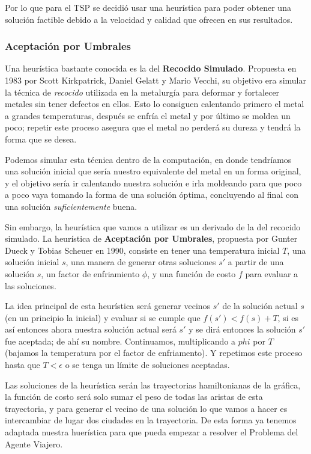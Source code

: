 \documentclass{article}
\newcommand{\tbf}[1]{\textbf{#1}}
\newcommand{\tit}[1]{\textit{#1}}
\begin{document}
  Por lo que para el TSP se decidió usar una heurística para poder 
  obtener una solución factible debido a la velocidad y calidad que
  ofrecen en sus resultados.

  \subsubsection{Aceptación por Umbrales} \label{simulatedAnnealing}
  Una heurística bastante conocida es la del \tbf{Recocido Simulado}. 
  Propuesta en 1983 por Scott Kirkpatrick, Daniel Gelatt y Mario
  Vecchi, su objetivo era simular la técnica de \tit{recocido}
  utilizada en la metalurgía para deformar y fortalecer metales sin 
  tener defectos en ellos. Esto lo consiguen calentando primero el 
  metal a grandes temperaturas, después se enfría el metal y por 
  último se moldea un poco; repetir este proceso asegura que el 
  metal no perderá su dureza y tendrá la forma que se desea.

  Podemos simular esta técnica dentro de la computación, en donde 
  tendríamos una solución inicial que sería nuestro equivalente 
  del metal en un forma original, y el objetivo sería ir calentando 
  nuestra solución e irla moldeando para que poco a poco vaya tomando 
  la forma de una solución óptima, concluyendo al final con una 
  solución \tit{suficientemente} buena.

  Sin embargo, la heurística que vamos a utilizar es un derivado 
  de la del recocido simulado. La heurística de \tbf{Aceptación por 
  Umbrales}, propuesta por Gunter Dueck y Tobias Scheuer en 1990,
  consiste en tener una temperatura inicial $T$, una solución 
  inicial $s$, una manera de generar otras soluciones $s'$ a partir
  de una solución $s$, un factor de enfriamiento $\phi$, y una función 
  de costo $f$ para evaluar a las soluciones.
  
  La idea principal de esta heurística será generar vecinos $s'$ de la 
  solución actual $s$ (en un principio la inicial) y evaluar si se 
  cumple que  $f(s') < f(s) + T$, si es así entonces ahora nuestra 
  solución actual será $s'$ y se dirá entonces la solución $s'$ 
  fue aceptada; de ahí su nombre. Continuamos, multiplicando 
  a $phi$ por $T$ (bajamos la temperatura por el factor de enfriamento).
  Y repetimos este proceso hasta que $T < \epsilon$ o se tenga un 
  límite de soluciones aceptadas.

  Las soluciones de la heurística serán las trayectorias hamiltonianas
  de la gráfica, la función de costo será solo sumar el peso de todas 
  las aristas de esta trayectoria, y para generar el vecino de una 
  solución lo que vamos a hacer es intercambiar de lugar dos ciudades
  en la trayectoria. De esta forma ya tenemos adaptada nuestra 
  huerística para que pueda empezar a resolver el Problema del Agente 
  Viajero.
\end{document}
